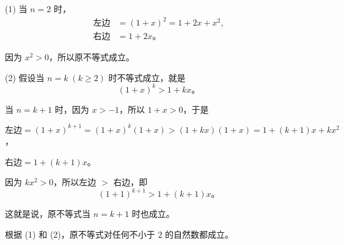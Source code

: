 \zhengming (1) 当 $n = 2$ 时，
\begin{align*}
    \text{左边} &= (1 + x)^2 = 1 + 2x + x^2, \\
    \text{右边} &= 1 + 2x \text{。}
\end{align*}

因为 $x^2 > 0$，所以原不等式成立。

(2) 假设当 $n = k \; (k \geqslant 2)$ 时不等式成立，就是
$$ (1 + x)^k > 1 + kx \text{。} $$

当 $n = k + 1$ 时，因为 $x > -1$，所以 $1 + x > 0$，于是

$\text{左边} = (1 + x)^{k + 1} = (1 + x)^k (1 + x) > (1 + kx)(1 + x) = 1 + (k + 1)x + kx^2$，

$\text{右边} = 1 + (k + 1) x$。

因为 $kx^2 > 0$，所以左边 $>$ 右边，即
$$ (1 + 1)^{k + 1} > 1 + (k + 1)x \text{。} $$

这就是说，原不等式当 $n = k + 1$ 时也成立。

根据 (1) 和 (2)，原不等式对任何不小于 $2$ 的自然数都成立。


\lianxi
\begin{xiaotis}
\setcounter{cntxiaoti}{0}




\end{xiaotis}

